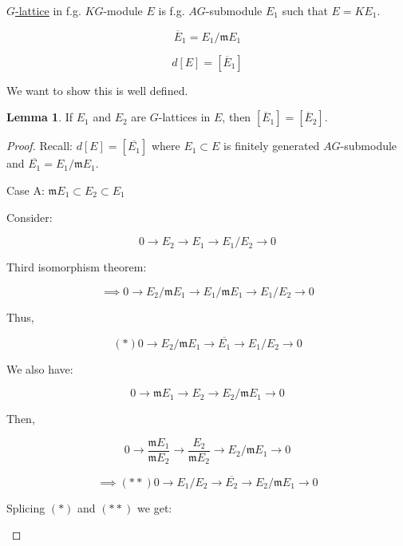 \documentclass{article}
\theoremstyle{definition}
\newtheorem{lemma}[theorem]{Lemma}
\begin{document}
\underline{\(G\)-lattice} in f.g. \(KG\)-module \(E\) is f.g. \(AG\)-submodule \(E_1\) such that \(E = K E_1\).

\[
    \overline{E}_1 = E_1 / \mathfrak{m} E_1
\]

\[
    d[E] = [\overline{E}_1]
\]

We want to show this is well defined.

\begin{lemma}
    If \(E_1\) and \(E_2\) are \(G\)-lattices in \(E\), then \([\overline{E}_1] = [\overline{E}_2]\). 
\end{lemma}

\begin{proof}
    Recall: \(d[E] = [\overline{E_1}]\) where \(E_1 \subset E\) is finitely generated \(AG\)-submodule and \(\overline{E_1} = E_1 / \mathfrak{m} E_1\).

    Case A: \(\mathfrak{m} E_1 \subset E_2 \subset E_1\) 

    Consider:

    \[
        0 \to E_2 \to E_1 \to E_1 / E_2 \to 0
    \]

    Third isomorphism theorem:

    \[
        \implies 0 \to E_2 / \mathfrak{m} E_1 \to E_1 / \mathfrak{m} E_1 \to E_1 / E_2 \to 0
    \]

    Thus,

    \[
        (\ast) 0 \to E_2 / \mathfrak{m} E_1 \to \overline{E_1} \to E_1 / E_2 \to 0
    \]

    We also have:

    \[
        0 \to \mathfrak{m} E_1 \to E_2 \to E_2 / \mathfrak{m} E_1 \to 0
    \]

    Then,

    \[
        0 \to \frac{\mathfrak{m} E_1}{\mathfrak{m} E_2} \to \frac{E_2}{\mathfrak{m} E_2} \to E_2 / \mathfrak{m} E_1 \to 0
    \]

    \[
        \implies (\ast \ast) 0 \to E_1 / E_2 \to \overline{E_2} \to E_2 / \mathfrak{m} E_1 \to 0
    \]


    Splicing \((\ast)\) and \((\ast \ast)\) we get:

    \begin{center}
    \end{center}


\end{proof}
\end{document}

